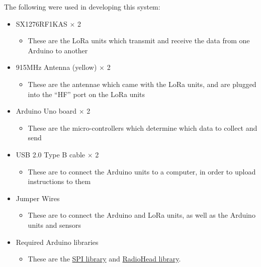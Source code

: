The following were used in developing this system:
\begin{itemize}
\item SX1276RF1KAS $\times$ 2
  \begin{itemize}
  \item These are the LoRa units which transmit and receive the data from one Arduino to another
  \end{itemize}
\item 915MHz Antenna (yellow) $\times$ 2
  \begin{itemize}
  \item These are the antennae which came with the LoRa units, and are plugged into the ``HF'' port on the LoRa units
  \end{itemize}
\item Arduino Uno board $\times$ 2
  \begin{itemize}
  \item These are the micro-controllers which determine which data to collect and send
  \end{itemize}
\item USB 2.0 Type B cable $\times$ 2
  \begin{itemize}
  \item These are to connect the Arduino units to a computer, in order to upload instructions to them
  \end{itemize}
\item Jumper Wires
  \begin{itemize}
  \item These are to connect the Arduino and LoRa units, as well as the Arduino units and sensors
  \end{itemize}
\item Required Arduino libraries
  \begin{itemize}
  \item These are the \href{https://www.arduino.cc/en/Reference/SPI}{SPI library} and \href{https://github.com/PaulStoffregen/RadioHead}{RadioHead library}.
  \end{itemize}

\end{itemize}

